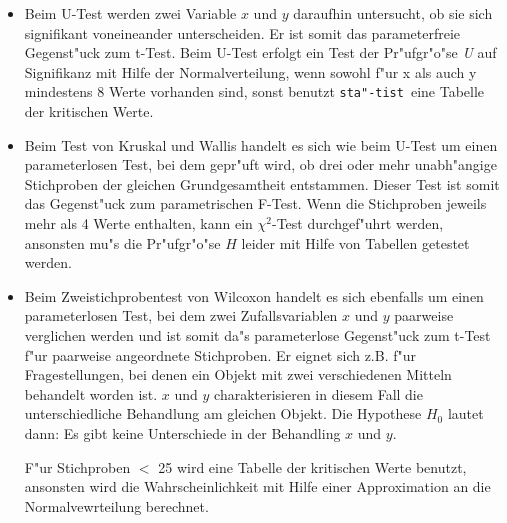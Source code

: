 \documentclass[a4paper,11pt]{article}
\newcommand{\st}{{\tt sta"-tist}}
\begin{document}
\begin{itemize}
\item Beim U-Test werden zwei Variable $x$ und $y$ daraufhin
  untersucht, ob sie sich signifikant voneineander unterscheiden. Er
  ist somit das parameterfreie Gegenst"uck zum t-Test.  Beim U-Test
  erfolgt ein Test der Pr"ufgr"o"se {\em U\/} auf Signifikanz mit Hilfe
  der Normalverteilung, wenn sowohl f"ur x als auch y mindestens 8
  Werte vorhanden sind, sonst benutzt \st\ eine Tabelle
  der kritischen Werte.
\item Beim Test von {\sc Kruskal} und {\sc Wallis} handelt es sich wie
  beim U-Test um einen parameterlosen Test, bei dem gepr"uft wird, ob
  drei oder mehr unabh"angige Stichproben der gleichen Grundgesamtheit
  entstammen. Dieser Test ist somit das Gegenst"uck zum parametrischen
  F-Test. Wenn die Stichproben jeweils mehr als 4 Werte enthalten,
  kann ein $\chi^2$-Test durchgef"uhrt werden, ansonsten mu"s die
  Pr"ufgr"o"se $H$ leider mit Hilfe von Tabellen getestet werden.
\item Beim Zweistichprobentest von {\sc Wilcoxon} handelt es sich
  ebenfalls um einen parameterlosen Test, bei dem zwei
  Zufallsvariablen $x$ und $y$ paarweise verglichen werden und ist
  somit da"s parameterlose Gegenst"uck zum t-Test f"ur paarweise
  angeordnete Stichproben. Er eignet sich z.B. f"ur Fragestellungen,
  bei denen ein Objekt mit zwei verschiedenen Mitteln behandelt worden
  ist. $x$ und $y$ charakterisieren in diesem Fall die
  unterschiedliche Behandlung am gleichen Objekt. Die Hypothese $H_0$
  lautet dann: Es gibt keine Unterschiede in der Behandling $x$ und
  $y$.

  F"ur Stichproben $<$ 25 wird eine Tabelle der kritischen Werte
  benutzt, ansonsten wird die Wahrscheinlichkeit mit Hilfe einer
  Approximation an die Normalvewrteilung berechnet.
  

\end{itemize}
\end{document}
